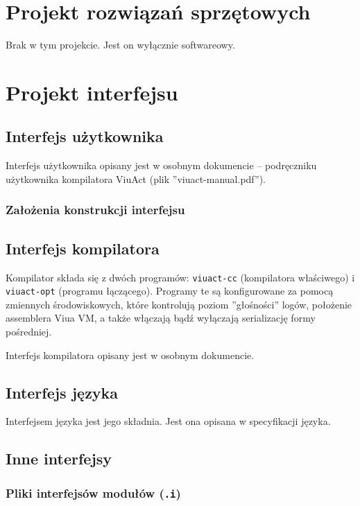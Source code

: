 \documentclass[11pt,oneside,a4paper,titlepage,onecolumn]{article}
\begin{document}
\section{Projekt rozwiązań sprzętowych}

Brak w tym projekcie. Jest on wyłącznie softwareowy.

\section{Projekt interfejsu}

\subsection{Interfejs użytkownika}

Interfejs użytkownika opisany jest w osobnym dokumencie -- podręczniku użytkownika kompilatora ViuAct (plik
''viuact-manual.pdf'').

\subsubsection{Założenia konstrukcji interfejsu}

\subsection{Interfejs kompilatora}

Kompilator składa się z dwóch programów: \texttt{viuact-cc} (kompilatora właściwego) i \texttt{viuact-opt}
(programu łączącego). Programy te są konfigurowane za pomocą zmiennych środowiskowych, które kontrolują poziom
''głośności'' logów, położenie assemblera Viua VM, a także włączają bądź wyłączają serializację formy
pośredniej.

Interfejs kompilatora opisany jest w osobnym dokumencie.

\subsection{Interfejs języka}

Interfejsem języka jest jego składnia.
Jest ona opisana w specyfikacji języka.

\subsection{Inne interfejsy}

\subsubsection{Pliki interfejsów modułów (\texttt{.i})}
\label{pliki_interfejsow_modulow}
\end{document}
